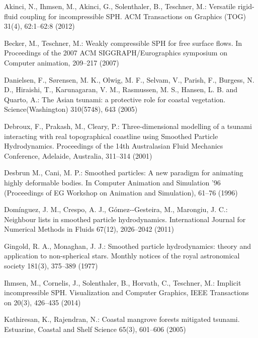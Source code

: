 \documentclass{llncs}
\begin{document}
\begin{thebibliography}{14}

 Akinci, N., Ihmsen, M., Akinci, G., Solenthaler, B.,
  Teschner, M.: Versatile rigid-fluid coupling for incompressible SPH. ACM Transactions on
  Graphics (TOG) 31(4), 62:1--62:8 (2012)

 Becker, M., Teschner, M.: Weakly compressible SPH for free
  surface flows. In Proceedings of the 2007 ACM SIGGRAPH/Eurographics symposium on
  Computer animation, 209--217 (2007)

 Danielsen, F., S{\o}rensen, M. K., Olwig, M. F., Selvam, V.,
  Parish, F., Burgess, N. D., Hiraishi, T., Karunagaran, V. M., Rasmussen, M. S., Hansen,
  L. B. and Quarto, A.: The Asian tsunami: a protective role for coastal
  vegetation. Science(Washington) 310(5748), 643 (2005)

 Debroux, F., Prakash, M., Cleary, P.: Three-dimensional
  modelling of a tsunami interacting with real topographical coastline using Smoothed
  Particle Hydrodynamics. Proceedings of the 14th Australasian Fluid Mechanics Conference,
  Adelaide, Australia, 311--314 (2001)

 Desbrun M., Cani, M. P.: Smoothed particles: A new paradigm
  for animating highly deformable bodies. In Computer Animation and Simulation ’96
  (Proceedings of EG Workshop on Animation and Simulation), 61--76 (1996)

 Dom\'{i}nguez, J. M., Crespo, A. J., G\'{o}mez-‐Gesteira, M.,
  Marongiu, J. C.: Neighbour lists in smoothed particle hydrodynamics. International
  Journal for Numerical Methods in Fluids 67(12), 2026--2042 (2011)

 Gingold, R. A., Monaghan, J. J.: Smoothed particle hydrodynamics:
  theory and application to non-spherical stars. Monthly notices of the royal astronomical
  society 181(3), 375--389 (1977)

 Ihmsen, M., Cornelis, J., Solenthaler, B., Horvath, C.,
  Teschner, M.: Implicit incompressible SPH. Visualization and Computer Graphics, IEEE
  Transactions on 20(3), 426--435 (2014)

 Kathiresan, K., Rajendran, N.: Coastal mangrove forests
  mitigated tsunami. Estuarine, Coastal and Shelf Science 65(3), 601--606 (2005)


\end{thebibliography}
\end{document}
